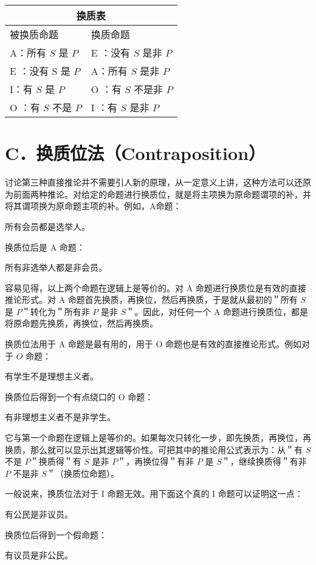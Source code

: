 \begin{center}
\begin{tabular}{|l|l|}
\hline
\multicolumn{2}{|c|}{换质表} \\
\hline
被换质命题 & 换质命题 \\
\hline
A：所有 $S$ 是 $P$ & E ：没有 $S$ 是非 $P$ \\
\hline
E ：没有 S 是 $P$ & A：所有 $S$ 是非 $P$ \\
\hline
I：有 $S$ 是 $P$ & O ：有 $S$ 不是非 $P$ \\
\hline
O ：有 $S$ 不是 $P$ & I ：有 $S$ 是非 $P$ \\
\hline
\end{tabular}
\end{center}

\section*{C．换质位法（Contraposition）}
讨论第三种直接推论并不需要引人新的原理，从一定意义上讲，这种方法可以还原为前面两种推论。对给定的命题进行换质位，就是将主项换为原命题谓项的补，并将其谓项换为原命题主项的补。例如，A命题：

所有会员都是选举人。

换质位后是 A 命题：

所有非选举人都是非会员。

容易见得，以上两个命题在逻辑上是等价的。对 A 命题进行换质位是有效的直接推论形式。对 A 命题首先换质，再换位，然后再换质，于是就从最初的＂所有 $S$ 是 $P$＂转化为＂所有非 $P$ 是非 $S$＂。因此，对任何一个 A 命题进行换质位，都是将原命题先换质，再换位，然后再换质。

换质位法用于 A 命题是最有用的，用于 O 命题也是有效的直接推论形式。例如对于 $O$ 命题：

有学生不是理想主义者。

换质位后得到一个有点绕口的 O 命题：

有非理想主义者不是非学生。

它与第一个命题在逻辑上是等价的。如果每次只转化一步，即先换质，再换位，再换质，那么就可以显示出其逻辑等价性。可把其中的推论用公式表示为：从＂有 $S$ 不是 $P$＂换质得＂有 $S$ 是非 $P$＂，再换位得＂有非 $P$ 是 $S$＂，继续换质得＂有非 $P$ 不是非 $S$＂（换质位命题）。

一般说来，换质位法对于 I 命题无效。用下面这个真的 I 命题可以证明这一点：

有公民是非议员。

换质位后得到一个假命题：

有议员是非公民。


